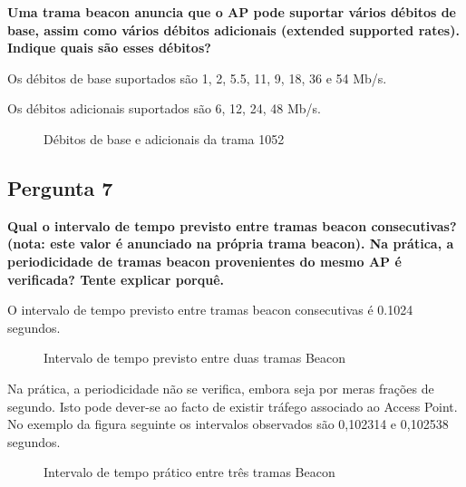 \documentclass[11pt]{article}
\begin{document}
\textbf{Uma trama beacon anuncia que o AP pode suportar vários débitos de base, assim como vários débitos adicionais (extended supported rates). Indique quais são esses débitos?}

Os débitos de base suportados são 1, 2, 5.5, 11, 9, 18, 36 e 54 Mb/s.

Os débitos adicionais suportados são 6, 12, 24, 48 Mb/s.

\begin{figure}[hbt!]
    \centering
    \caption{Débitos de base e adicionais da trama 1052}
\end{figure}

\subsection{Pergunta 7}

\textbf{Qual o intervalo de tempo previsto entre tramas beacon consecutivas? (nota: este valor é anunciado na própria trama beacon). Na prática, a periodicidade de tramas beacon provenientes do mesmo AP é verificada? Tente explicar porquê.}

O intervalo de tempo previsto entre tramas beacon consecutivas é 0.1024 segundos.

\begin{figure}[hbt!]
    \centering
    \caption{Intervalo de tempo previsto entre duas tramas Beacon}
\end{figure}

Na prática, a periodicidade não se verifica, embora seja por meras frações de segundo. Isto pode dever-se ao facto de existir tráfego associado ao Access Point. No exemplo da figura seguinte os intervalos observados são 0,102314 e 0,102538 segundos.

\begin{figure}[hbt!]
    \centering
    \caption{Intervalo de tempo prático entre três tramas Beacon}
\end{figure}
\clearpage
\end{document}
